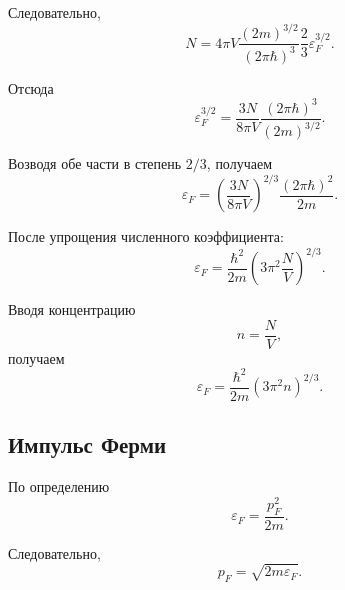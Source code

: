 \documentclass[../final.tex]{subfiles}
\begin{document}
Следовательно,
%
\begin{equation*}
    N
    =
    4\pi V
    \frac{
        (2m)^{3/2}
    }{
        (2\pi\hbar)^3
    }
    \frac{2}{3}
    \varepsilon_F^{3/2}.
\end{equation*}

Отсюда
%
\begin{equation*}
    \varepsilon_F^{3/2}
    =
    \frac{
        3N
    }{
        8\pi V
    }
    \frac{
        (2\pi\hbar)^3
    }{
        (2m)^{3/2}
    }.
\end{equation*}

Возводя обе части в степень $2/3$, получаем
%
\begin{equation*}
    \varepsilon_F
    =
    \left(
        \frac{
            3N
        }{
            8\pi V
        }
    \right)^{2/3}
    \frac{
        (2\pi\hbar)^2
    }{
        2m
    }.
\end{equation*}

После упрощения численного коэффициента:
%
\begin{equation*}
    \boxed{
        \varepsilon_F
        =
        \frac{
            \hbar^2
        }{
            2m
        }
        \left(
            3\pi^2
            \frac{N}{V}
        \right)^{2/3}
    }.
\end{equation*}

Вводя концентрацию
%
\begin{equation*}
    n
    =
    \frac{N}{V},
\end{equation*}
%
получаем
%
\begin{equation*}
    \boxed{
        \varepsilon_F
        =
        \frac{
            \hbar^2
        }{
            2m
        }
        (3\pi^2n)^{2/3}
    }.
\end{equation*}



\subsection*{Импульс Ферми}

По определению
%
\begin{equation*}
    \varepsilon_F
    =
    \frac{
        p_F^2
    }{
        2m
    }.
\end{equation*}

Следовательно,
%
\begin{equation*}
    p_F
    =
    \sqrt{
        2m\varepsilon_F
    }.
\end{equation*}
\end{document}
